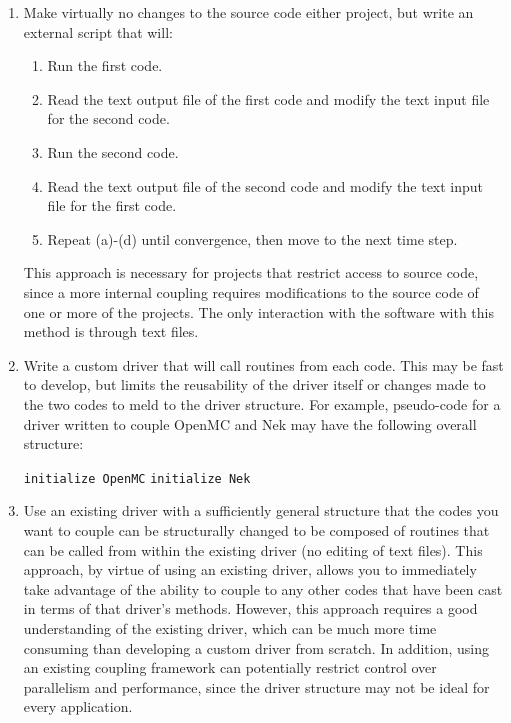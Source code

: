 \documentclass[10pt]{article}
\numberwithin{equation}{section} %
\begin{document}
\begin{enumerate}
\item Make virtually no changes to the source code either project, but write an external script that will:
	\begin{enumerate}
	\item Run the first code.
	\item Read the text output file of the first code and modify the text input file for the second code.
	\item Run the second code.
	\item Read the text output file of the second code and modify the text input file for the first code. 
	\item Repeat (a)-(d) until convergence, then move to the next time step.
	\end{enumerate}
	This approach is necessary for projects that restrict access to source code, since a more internal coupling requires modifications to the source code of one or more of the projects. The only interaction with the software with this method is through text files.
\item Write a custom driver that will call routines from each code. This may be fast to develop, but limits the reusability of the driver itself or changes made to the two codes to meld to the driver structure. For example, pseudo-code for a driver written to couple OpenMC and Nek may have the following overall structure:

	\begin{algorithm}[H]
	{\tt initialize OpenMC}\;
	{\tt initialize Nek}\;
	\;
	\end{algorithm}
	
\item Use an existing driver with a sufficiently general structure that the codes you want to couple can be structurally changed to be composed of routines that can be called from within the existing driver (no editing of text files). This approach, by virtue of using an existing driver, allows you to immediately take advantage of the ability to couple to any other codes that have been cast in terms of that driver's methods. However, this approach requires a good understanding of the existing driver, which can be much more time consuming than developing a custom driver from scratch. In addition, using an existing coupling framework can potentially restrict control over parallelism and performance, since the driver structure may not be ideal for every application.
\end{enumerate}
\end{document}
